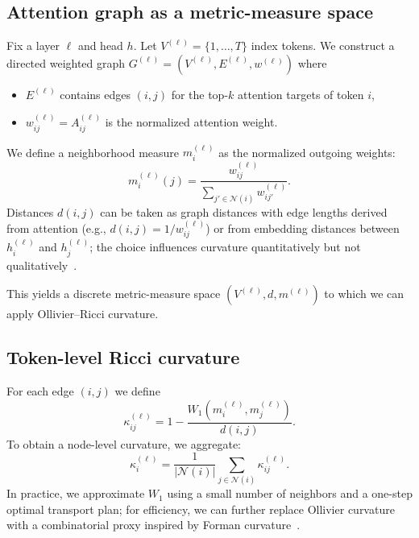 \documentclass{article}
\theoremstyle{plain}
\theoremstyle{definition}
\theoremstyle{remark}
\newcommand{\cN}{\mathcal{N}}
\begin{document}
\subsection{Attention graph as a metric-measure space}

Fix a layer $\ell$ and head $h$. Let $V^{(\ell)} = \{1,\dots,T\}$ index tokens. We construct a directed weighted graph $G^{(\ell)} = (V^{(\ell)}, E^{(\ell)}, w^{(\ell)})$ where
\begin{itemize}
  \item $E^{(\ell)}$ contains edges $(i,j)$ for the top-$k$ attention targets of token $i$,
  \item $w^{(\ell)}_{ij} = A^{(\ell)}_{ij}$ is the normalized attention weight.
\end{itemize}

We define a neighborhood measure $m_i^{(\ell)}$ as the normalized outgoing weights:
\begin{equation}
  m_i^{(\ell)}(j) = \frac{w^{(\ell)}_{ij}}{\sum_{j' \in \cN(i)} w^{(\ell)}_{ij'}}.
\end{equation}
Distances $d(i,j)$ can be taken as graph distances with edge lengths derived from attention (e.g., $d(i,j) = 1/w^{(\ell)}_{ij}$) or from embedding distances between $h^{(\ell)}_i$ and $h^{(\ell)}_j$; the choice influences curvature quantitatively but not qualitatively~\citep{ollivier2009ricci,tian2025curvatureclustering}.

This yields a discrete metric-measure space $(V^{(\ell)}, d, m^{(\ell)})$ to which we can apply Ollivier--Ricci curvature.

\subsection{Token-level Ricci curvature}

For each edge $(i,j)$ we define
\begin{equation}
  \kappa^{(\ell)}_{ij} = 1 - \frac{W_1(m_i^{(\ell)}, m_j^{(\ell)})}{d(i,j)}.
\end{equation}
To obtain a node-level curvature, we aggregate:
\begin{equation}
  \kappa^{(\ell)}_i = \frac{1}{|\cN(i)|} \sum_{j\in \cN(i)} \kappa^{(\ell)}_{ij}.
\end{equation}
In practice, we approximate $W_1$ using a small number of neighbors and a one-step optimal transport plan; for efficiency, we can further replace Ollivier curvature with a combinatorial proxy inspired by Forman curvature~\citep{forman2003bochner,ni2019community,weber2024discrete}.
\end{document}
